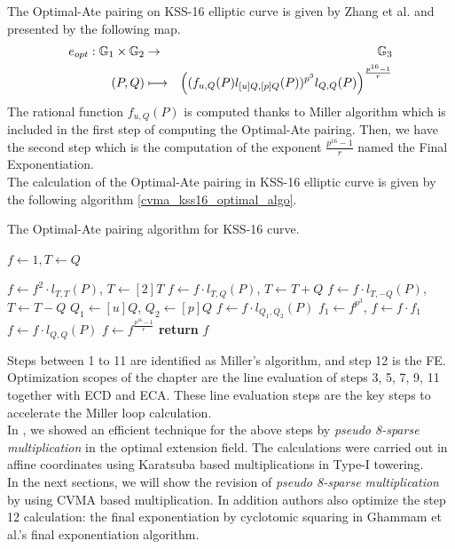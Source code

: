 The Optimal-Ate pairing on KSS-16 elliptic curve is given by Zhang et al. \cite{INDOCRYPT:ZhaLin12} and presented by the following map.
\begin{eqnarray*}
  e_{opt}: {\mathbb{G}}_{1}\times {\mathbb{G}}_{2} &\rightarrow & {\mathbb{G}}_{3} \\
  (P,Q) &\longmapsto &\left(( f_{u,Q}(P)l_{[u]Q,[p]Q}(P))^{p^3}l_{Q,Q}(P)\right)^{\frac{p^{16}-1}{r}}
\end{eqnarray*}
The rational function $f_{u,Q}(P)$ is computed thanks to Miller algorithm which is included in the first step of computing the Optimal-Ate pairing. Then, we have the second step which is the computation of the exponent $\frac{p^{16}-1}{r}$ named the Final Exponentiation.\\
The calculation of the Optimal-Ate pairing in KSS-16 elliptic curve is given by the following algorithm \ref{cvma_kss16_optimal_algo}.
\begin{algorithm}[ht]
	\caption{The Optimal-Ate pairing algorithm for KSS-16 curve.}
	\label{cvma_kss16_optimal_algo}
	\DontPrintSemicolon
%	
%	
	 $f \leftarrow 1,T \leftarrow Q$
	
	  {
		 $f\leftarrow f^2\cdot l_{T,T}(P)$, $T\leftarrow [2]T$ 
		  {
			 $f\leftarrow f\cdot l_{T,Q}(P)$, $T\leftarrow T+Q$ }
		  {
			 $f\leftarrow f\cdot l_{T,-Q}(P)$, $T\leftarrow T-Q$} } 
	 $Q_1\leftarrow [u]Q$, $Q_2\leftarrow [p]Q$ \;
	 $f\leftarrow f\cdot l_{Q_1,Q_2}(P)$ \;
	 $f_1\leftarrow f^{p^3}$, $f\leftarrow f\cdot f_1$ \;
	 $f\leftarrow f\cdot l_{Q,Q}(P)$ \;
	 $f\leftarrow f^{\frac{p^{16}-1}{r}}$\;
	 {\bf return} $f$\;
\end{algorithm}

Steps between  1 to 11 are identified as Miller's algorithm, and step 12 is the FE.
Optimization scopes of the chapter are the line evaluation of steps 3, 5, 7, 9, 11 together with ECD and ECA.
These line evaluation steps are the key steps to accelerate the Miller loop calculation. \\
In \cite{INDOCRYPT:KNGDNK17}, we showed an efficient technique for the above steps by \textit{pseudo 8-sparse multiplication} in the optimal extension field. 
The calculations were carried out in affine coordinates using Karatsuba based multiplications in Type-I towering. \\
In the next sections, we will show the revision of \textit{pseudo 8-sparse multiplication} by using CVMA based multiplication.
In addition authors also optimize the step 12 calculation: the final exponentiation  by cyclotomic squaring \cite{PKC:GraSco10} in Ghammam et al.'s \cite{EPRINT:GhaFou16b} final exponentiation algorithm.

